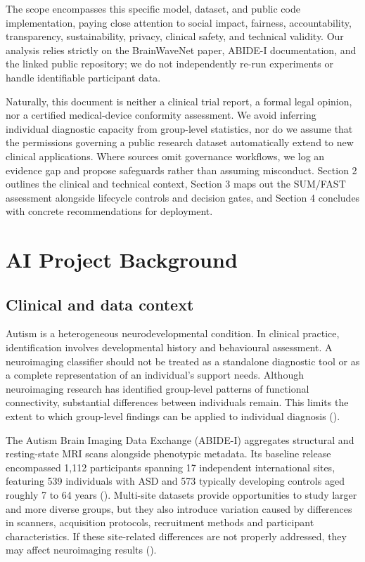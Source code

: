 \documentclass[11pt,a4paper]{article}
\begin{document}
The scope encompasses this specific model, dataset, and public code implementation, paying close attention to social impact, fairness, accountability, transparency, sustainability, privacy, clinical safety, and technical validity. Our analysis relies strictly on the BrainWaveNet paper, ABIDE-I documentation, and the linked public repository; we do not independently re-run experiments or handle identifiable participant data.

Naturally, this document is neither a clinical trial report, a formal legal opinion, nor a certified medical-device conformity assessment. We avoid inferring individual diagnostic capacity from group-level statistics, nor do we assume that the permissions governing a public research dataset automatically extend to new clinical applications. Where sources omit governance workflows, we log an evidence gap and propose safeguards rather than assuming misconduct. Section 2 outlines the clinical and technical context, Section 3 maps out the SUM/FAST assessment alongside lifecycle controls and decision gates, and Section 4 concludes with concrete recommendations for deployment.

\section{AI Project Background}
\subsection{Clinical and data context}
Autism is a heterogeneous neurodevelopmental condition. In clinical practice, identification involves developmental history and behavioural assessment. A neuroimaging classifier should not be treated as a standalone diagnostic tool or as a complete representation of an individual's support needs. Although neuroimaging research has identified group-level patterns of functional connectivity, substantial differences between individuals remain. This limits the extent to which group-level findings can be applied to individual diagnosis (\cite{holiga2019}).

The Autism Brain Imaging Data Exchange (ABIDE-I) aggregates structural and resting-state MRI scans alongside phenotypic metadata. Its baseline release encompassed 1,112 participants spanning 17 independent international sites, featuring 539 individuals with ASD and 573 typically developing controls aged roughly 7 to 64 years (\cite{dimartino2014,abidewebsite}). Multi-site datasets provide opportunities to study larger and more diverse groups, but they also introduce variation caused by differences in scanners, acquisition protocols, recruitment methods and participant characteristics. If these site-related differences are not properly addressed, they may affect neuroimaging results (\cite{abraham2017,abideharmonization2022}).
\end{document}
